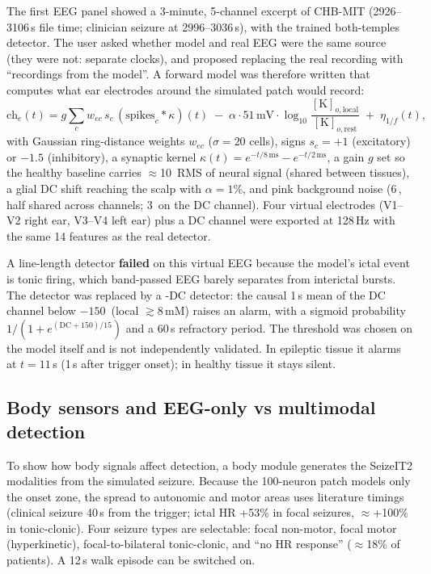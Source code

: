 The first EEG panel showed a 3-minute, 5-channel excerpt of CHB-MIT  (2926--3106\,s file time; clinician seizure at 2996--3036\,s), with the trained both-temples detector. The user asked whether model and real EEG were the same source (they were not: separate clocks), and proposed replacing the real recording with ``recordings from the model''. A forward model was therefore written that computes what ear electrodes around the simulated patch would record:
\begin{equation}
\mathrm{ch}_e(t) = g\sum_c w_{ec}\,s_c\,(\mathrm{spikes}_c * \kappa)(t) \;-\; \alpha\cdot51\,\mathrm{mV}\cdot\log_{10}\frac{[\mathrm K]_{o,\mathrm{local}}}{[\mathrm K]_{o,\mathrm{rest}}} \;+\; \eta_{1/f}(t),
\end{equation}
with Gaussian ring-distance weights $w_{ec}$ ($\sigma=20$ cells), signs $s_c=+1$ (excitatory) or $-1.5$ (inhibitory), a synaptic kernel $\kappa(t)=e^{-t/8\,\mathrm{ms}}-e^{-t/2\,\mathrm{ms}}$, a gain $g$ set so the healthy baseline carries $\approx$10\,\uV{} RMS of neural signal (shared between tissues), a glial \Kp{} DC shift reaching the scalp with $\alpha=1$\%, and pink background noise (6\,\uV, half shared across channels; 3\,\uV{} on the DC channel). Four virtual electrodes (V1--V2 right ear, V3--V4 left ear) plus a DC channel were exported at 128\,Hz with the same 14 features as the real detector.

A line-length detector \textbf{failed} on this virtual EEG because the model's ictal event is tonic firing, which band-passed EEG barely separates from interictal bursts. The detector was replaced by a \Kp-DC detector: the causal 1\,s mean of the DC channel below $-150$\,\uV{} (local \Ko{} $\gtrsim$8\,mM) raises an alarm, with a sigmoid probability $1/(1+e^{(\mathrm{DC}+150)/15})$ and a 60\,s refractory period. The threshold was chosen on the model itself and is not independently validated. In epileptic tissue it alarms at $t=11$\,s (1\,s after trigger onset); in healthy tissue it stays silent.

\subsection{Body sensors and EEG-only vs multimodal detection}

To show how body signals affect detection, a body module generates the SeizeIT2 modalities from the simulated seizure. Because the 100-neuron patch models only the onset zone, the spread to autonomic and motor areas uses literature timings (clinical seizure 40\,s from the trigger; ictal HR +53\% in focal seizures, $\approx$+100\% in tonic-clonic). Four seizure types are selectable: focal non-motor, focal motor (hyperkinetic), focal-to-bilateral tonic-clonic, and ``no HR response'' ($\approx$18\% of patients). A 12\,s walk episode can be switched on.

